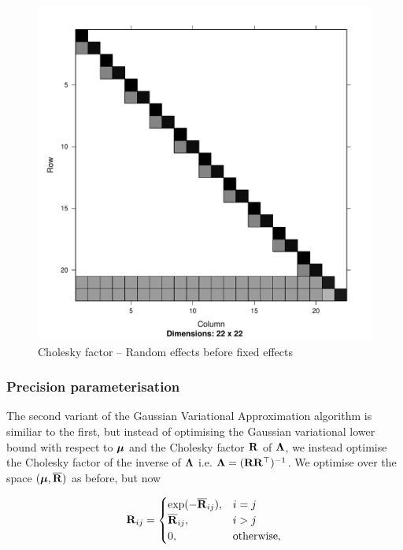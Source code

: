 \documentclass{amsart}[12pt]
\begin{document}
	\begin{figure}[p]
		\caption{\tiny Cholesky factor -- Random effects before fixed effects}
		\label{fig:cholrandomfixed}
		\includegraphics[scale=.25]{mZ_mX_cholesky.pdf}
	\end{figure}
	
	\subsubsection{Precision parameterisation}
		
	\noindent The second variant of the Gaussian Variational Approximation algorithm is similiar to the first, but
	instead of optimising the Gaussian variational lower bound with respect to ${\boldsymbol \mu}$ and the Cholesky factor
	${\bf R}$ of ${\boldsymbol \Lambda}$, we instead optimise the Cholesky factor of the inverse of ${\boldsymbol \Lambda}$ i.e. ${\boldsymbol \Lambda} =
	({\bf R} {\bf R}^\top)^{-1}$. We optimise over the space $({\boldsymbol \mu}, \overline{{\bf R}})$ as before, but now 
		
	\begin{equation*}
		{\bf R}_{ij} =
		\begin{cases}
			\exp(-\overline{{\bf R}}_{ij}), & i = j             \\
			\overline{{\bf R}}_{ij},        & i > j             \\
			0,                          & \text{otherwise}, 
		\end{cases}
	\end{equation*}
	
\end{document}
